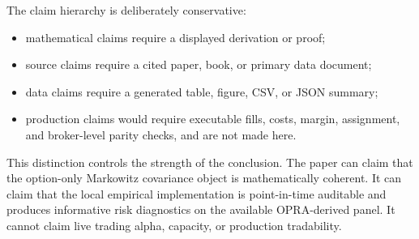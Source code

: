 The claim hierarchy is deliberately conservative:
\begin{itemize}[leftmargin=2em]
  \item mathematical claims require a displayed derivation or proof;
  \item source claims require a cited paper, book, or primary data document;
  \item data claims require a generated table, figure, CSV, or JSON summary;
  \item production claims would require executable fills, costs, margin, assignment, and
  broker-level parity checks, and are not made here.
\end{itemize}

This distinction controls the strength of the conclusion. The paper can claim that the
option-only Markowitz covariance object is mathematically coherent. It can claim that the
local empirical implementation is point-in-time auditable and produces informative risk
diagnostics on the available OPRA-derived panel. It cannot claim live trading alpha,
capacity, or production tradability.
